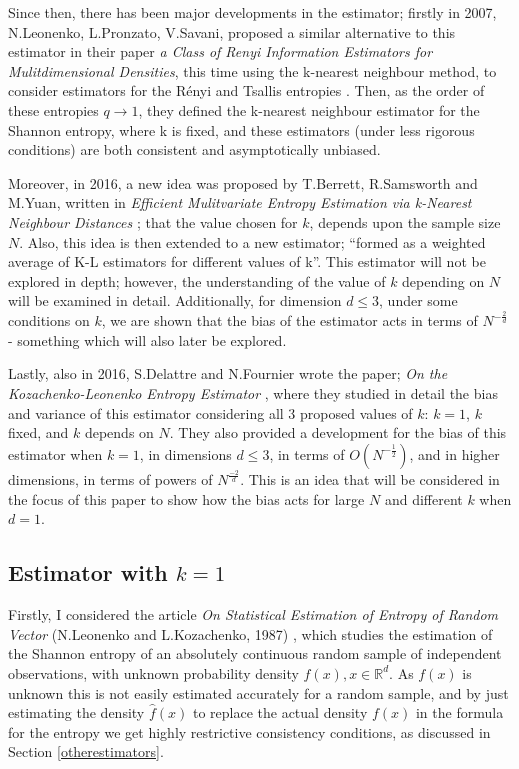 \documentclass[12pt]{report}
\begin{document}
Since then, there has been major developments in the estimator; firstly in 2007, N.Leonenko, L.Pronzato, V.Savani, proposed a similar alternative to this estimator in their paper \textit{a Class of Renyi Information Estimators for Mulitdimensional Densities}, this time using the k-nearest neighbour method, to consider estimators for the R\'enyi and Tsallis entropies \cite{paper2}. Then, as the order of these entropies $q \to 1$, they defined the k-nearest neighbour estimator for the Shannon entropy, where k is fixed, and these estimators (under less rigorous conditions) are both consistent and asymptotically unbiased.

Moreover, in 2016, a new idea was proposed by T.Berrett, R.Samsworth and M.Yuan, written in \textit{Efficient Mulitvariate Entropy Estimation via k-Nearest Neighbour Distances} \cite{paper4}; that the value chosen for $k$, depends upon the sample size $N$. Also, this idea is then extended to a new estimator; ``formed as a weighted average of K-L estimators for different values of k''. This estimator will not be explored in depth; however, the understanding of the value of $k$ depending on $N$ will be examined in detail. Additionally, for dimension $d \leq 3$, under some conditions on $k$, we are shown that the bias of the estimator acts in terms of $N^{-\frac{2}{d}}$ - something which will also later be explored.

Lastly, also in 2016, S.Delattre and N.Fournier wrote the paper; \textit{On the Kozachenko-Leonenko Entropy Estimator} \cite{paper3}, where they studied in detail the bias and variance of this estimator considering all 3 proposed values of $k$: $k = 1$, $k$ fixed, and $k$ depends on $N$. They also provided a development for the bias of this estimator when $k=1$, in dimensions $d \leq 3$, in terms of $O(N^{-\frac{1}{2}})$, and in higher dimensions, in terms of powers of $N^{\frac{-2}{d}}$. This is an idea that will be considered in the focus of this paper to show how the bias acts for large $N$ and different $k$ when $d=1$.


\subsection{Estimator with $k=1$}

Firstly, I considered the article \textit{On Statistical Estimation of Entropy of Random Vector} (N.Leonenko and L.Kozachenko, 1987) \cite{paper1}, which studies the estimation of the Shannon entropy of an absolutely continuous random sample of independent observations, with unknown probability density $f(x), x \in \mathbb{R}^{d}$. As $f(x)$ is unknown this is not easily estimated accurately for a random sample, and by just estimating the density $\hat{f}(x)$ to replace the actual density $f(x)$ in the formula for the entropy we get highly restrictive consistency conditions, as discussed in Section \ref{otherestimators}.
\end{document}
